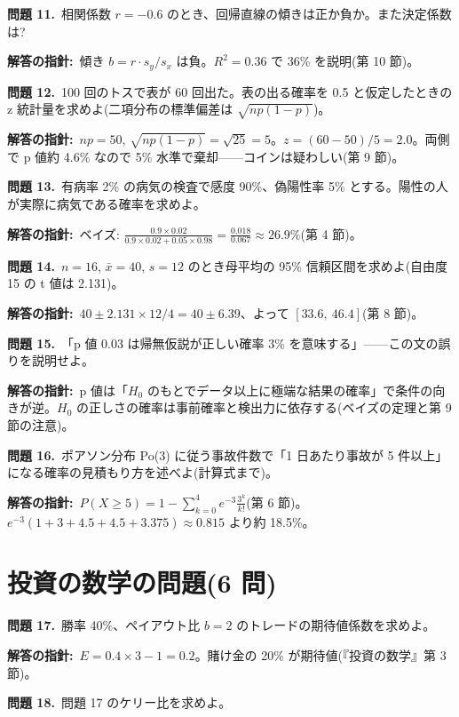 \documentclass{article}
\begin{document}
\textbf{問題 11.}\ 相関係数 \(r = -0.6\) のとき、回帰直線の傾きは正か負か。また決定係数は?

\textbf{解答の指針:}\ 傾き \(b = r \cdot s_y / s_x\) は負。\(R^2 = 0.36\) で 36\% を説明(第 10 節)。

\textbf{問題 12.}\ 100 回のトスで表が 60 回出た。表の出る確率を 0.5 と仮定したときの z 統計量を求めよ(二項分布の標準偏差は \(\sqrt{np(1-p)}\))。

\textbf{解答の指針:}\ \(np = 50\), \(\sqrt{np(1-p)} = \sqrt{25} = 5\)。\(z = (60 - 50)/5 = 2.0\)。両側で p 値約 4.6\% なので 5\% 水準で棄却——コインは疑わしい(第 9 節)。

\textbf{問題 13.}\ 有病率 2\% の病気の検査で感度 90\%、偽陽性率 5\% とする。陽性の人が実際に病気である確率を求めよ。

\textbf{解答の指針:}\ ベイズ: \(\frac{0.9 \times 0.02}{0.9 \times 0.02 + 0.05 \times 0.98} = \frac{0.018}{0.067} \approx 26.9\%\)(第 4 節)。

\textbf{問題 14.}\ \(n = 16\), \(\bar{x} = 40\), \(s = 12\) のとき母平均の 95\% 信頼区間を求めよ(自由度 15 の t 値は 2.131)。

\textbf{解答の指針:}\ \(40 \pm 2.131 \times 12/4 = 40 \pm 6.39\)、よって \([33.6,\ 46.4]\)(第 8 節)。

\textbf{問題 15.}\ 「p 値 0.03 は帰無仮説が正しい確率 3\% を意味する」——この文の誤りを説明せよ。

\textbf{解答の指針:}\ p 値は「\(H_0\) のもとでデータ以上に極端な結果の確率」で条件の向きが逆。\(H_0\) の正しさの確率は事前確率と検出力に依存する(ベイズの定理と第 9 節の注意)。

\textbf{問題 16.}\ ポアソン分布 Po(3) に従う事故件数で「1 日あたり事故が 5 件以上」になる確率の見積もり方を述べよ(計算式まで)。

\textbf{解答の指針:}\ \(P(X \ge 5) = 1 - \sum_{k=0}^{4} e^{-3} \frac{3^k}{k!}\)(第 6 節)。\(e^{-3}(1 + 3 + 4.5 + 4.5 + 3.375) \approx 0.815\) より約 18.5\%。

\section{投資の数学の問題(6 問)}

\textbf{問題 17.}\ 勝率 40\%、ペイアウト比 \(b = 2\) のトレードの期待値係数を求めよ。

\textbf{解答の指針:}\ \(E = 0.4 \times 3 - 1 = 0.2\)。賭け金の 20\% が期待値(『投資の数学』第 3 節)。

\textbf{問題 18.}\ 問題 17 のケリー比を求めよ。
\end{document}
